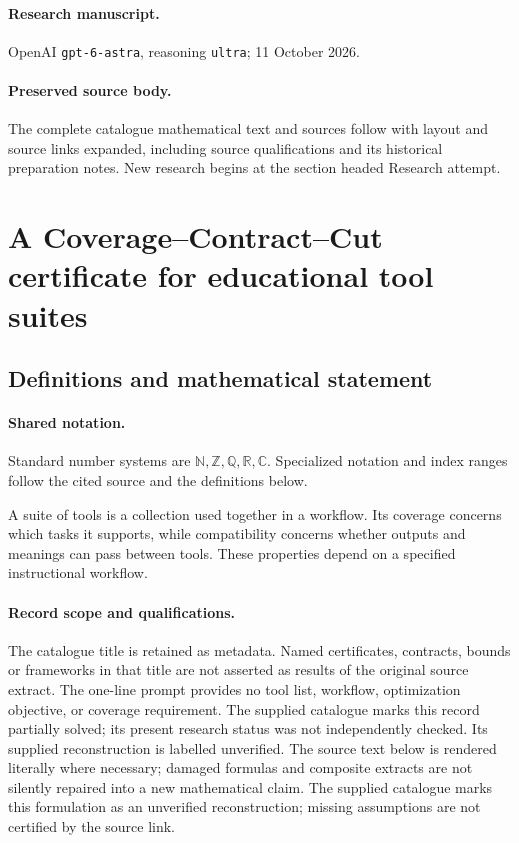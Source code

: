 \documentclass[11pt]{article}
\begin{document}
\paragraph{Research manuscript.} OpenAI \texttt{gpt-6-astra}, reasoning \texttt{ultra}; 11 October 2026.
\paragraph{Preserved source body.} The complete catalogue mathematical text and sources follow with layout and source links expanded, including source qualifications and its historical preparation notes. New research begins at the section headed Research attempt.

\section{A Coverage--Contract--Cut certificate for educational tool suites}\label{statement}

\subsection{Definitions and mathematical statement}

\paragraph{Shared notation.}Standard number systems are $\mathbb N,\mathbb Z,\mathbb Q,\mathbb R,\mathbb C$. Specialized notation and index ranges follow the cited source and the definitions below.


A suite of tools is a collection used together in a workflow. Its coverage concerns which tasks it supports, while compatibility concerns whether outputs and meanings can pass between tools. These properties depend on a specified instructional workflow.
\paragraph{Record scope and qualifications.}
The catalogue title is retained as metadata. Named certificates, contracts, bounds or frameworks in that title are not asserted as results of the original source extract.
The one-line prompt provides no tool list, workflow, optimization objective, or coverage requirement. The supplied catalogue marks this record partially solved; its present research status was not independently checked. Its supplied reconstruction is labelled unverified.
The source text below is rendered literally where necessary; damaged formulas and composite extracts are not silently repaired into a new mathematical claim.
The supplied catalogue marks this formulation as an unverified reconstruction; missing assumptions are not certified by the source link.
\end{document}
